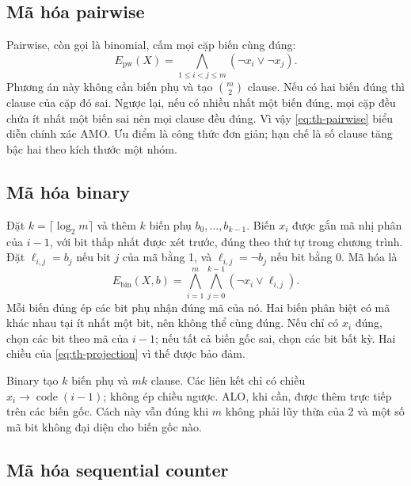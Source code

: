 \subsection{Mã hóa pairwise}

Pairwise, còn gọi là binomial, cấm mọi cặp biến cùng đúng:
\begin{equation}
 E_{\mathrm{pw}}(X)=
 \bigwedge_{1\leq i<j\leq m}(\neg x_i\lor\neg x_j).
 \label{eq:th-pairwise}
\end{equation}
Phương án này không cần biến phụ và tạo $\binom{m}{2}$ clause.
Nếu có hai biến đúng thì clause của cặp đó sai. Ngược lại, nếu có
nhiều nhất một biến đúng, mọi cặp đều chứa ít nhất một biến sai nên mọi
clause đều đúng. Vì vậy \eqref{eq:th-pairwise} biểu diễn chính xác AMO.
Ưu điểm là công thức đơn giản; hạn chế là số clause tăng bậc hai theo
kích thước một nhóm.

\subsection{Mã hóa binary}

Đặt $k=\lceil\log_2m\rceil$ và thêm $k$ biến phụ $b_0,\ldots,b_{k-1}$.
Biến $x_i$ được gắn mã nhị phân của $i-1$, với bit thấp nhất được xét
trước, đúng theo thứ tự trong chương trình. Đặt $\ell_{i,j}=b_j$ nếu
bit $j$ của mã bằng 1, và $\ell_{i,j}=\neg b_j$ nếu bit bằng 0. Mã hóa là
\begin{equation}
 E_{\mathrm{bin}}(X,b)=
 \bigwedge_{i=1}^{m}\bigwedge_{j=0}^{k-1}(\neg x_i\lor\ell_{i,j}).
 \label{eq:th-binary}
\end{equation}
Mỗi biến đúng ép các bit phụ nhận đúng mã của nó. Hai biến phân biệt có
mã khác nhau tại ít nhất một bit, nên không thể cùng đúng. Nếu chỉ có
$x_i$ đúng, chọn các bit theo mã của $i-1$; nếu tất cả biến gốc sai, chọn
các bit bất kỳ. Hai chiều của \eqref{eq:th-projection} vì thế được bảo đảm.

Binary tạo $k$ biến phụ và $mk$ clause. Các liên kết chỉ có chiều
$x_i\rightarrow\operatorname{code}(i-1)$; không ép chiều ngược.
ALO, khi cần, được thêm trực tiếp trên các biến gốc. Cách này vẫn đúng
khi $m$ không phải lũy thừa của 2 và một số mã bit không đại diện cho
biến gốc nào.

\subsection{Mã hóa sequential counter}

